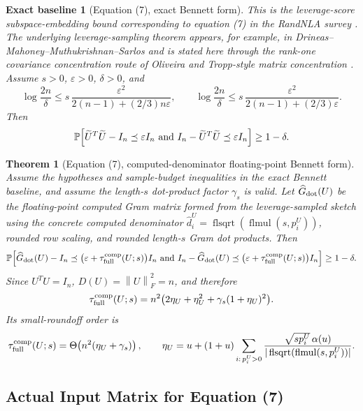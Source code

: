 \documentclass[11pt]{article}
\newcommand{\Prob}{\mathbb{P}}
\newcommand{\Frob}[1]{\left\lVert #1\right\rVert_F}
\newcommand{\Util}{\widetilde U}
\newcommand{\Ghat}{\widehat G}
\newcommand{\I}{I}
\newcommand{\eps}{\varepsilon}
\newtheorem{theorem}{Theorem}
\newtheorem*{baseline}{Exact baseline}
\theoremstyle{remark}
\begin{document}
\begin{baseline}[Equation (7), exact Bennett form]
This is the leverage-score subspace-embedding bound corresponding to equation
(7) in the RandNLA survey \cite{DrineasMahoney2016RandNLA}.  The underlying
leverage-sampling theorem appears, for example, in
Drineas--Mahoney--Muthukrishnan--Sarlos \cite{DrineasMahoneyMuthukrishnanSarlos2011}
and is stated here through the rank-one covariance concentration route of
Oliveira \cite{Oliveira2010} and Tropp-style matrix concentration
\cite{Tropp2012}.
Assume \(s>0\), \(\eps>0\), \(\delta>0\), and
\[
  \log\frac{2n}{\delta}
  \le
  s\,\frac{\eps^2}{2(n-1)+(2/3)n\eps},
  \qquad
  \log\frac{2n}{\delta}
  \le
  s\,\frac{\eps^2}{2(n-1)+(2/3)\eps}.
\]
Then
\[
  \Prob\!\left[
    \Util^T\Util-\I_n\preceq \eps\I_n
    \ \hbox{and}\
    \I_n-\Util^T\Util\preceq \eps\I_n
  \right]\ge 1-\delta .
\]
\end{baseline}

\begin{theorem}[Equation (7), computed-denominator floating-point Bennett form]
Assume the hypotheses and sample-budget inequalities in the exact Bennett
baseline, and assume the length-\(s\) dot-product factor \(\gamma_s\) is valid.
Let \(\Ghat_{\rm dot}(U)\) be the floating-point computed Gram matrix formed
from the leverage-sampled sketch using the concrete computed denominator
\(\widehat d_i^U=\operatorname{flsqrt}(\operatorname{flmul}(s,p_i^U))\),
rounded row scaling, and rounded length-\(s\) Gram dot products.  Then
\[
  \Prob\!\left[
    \Ghat_{\rm dot}(U)-\I_n
      \preceq
      \bigl(\eps+\tau_{\rm full}^{\rm comp}(U;s)\bigr)\I_n
    \ \hbox{and}\
    \I_n-\Ghat_{\rm dot}(U)
      \preceq
      \bigl(\eps+\tau_{\rm full}^{\rm comp}(U;s)\bigr)\I_n
  \right]\ge 1-\delta .
\]
Since \(U^TU=\I_n\), \(D(U)=\Frob{U}^2=n\), and therefore
\[
  \tau_{\rm full}^{\rm comp}(U;s)
  =
  n^2\bigl(2\eta_U+\eta_U^2+\gamma_s(1+\eta_U)^2\bigr).
\]
Its small-roundoff order is
\[
  \tau_{\rm full}^{\rm comp}(U;s)
  =
  \Theta\!\left(n^2(\eta_U+\gamma_s)\right),
  \qquad
  \eta_U=u+(1+u)
  \sum_{i:\,p_i^U>0}
    \frac{\sqrt{s p_i^U}\,\alpha(u)}
         {|\operatorname{flsqrt}(\operatorname{flmul}(s,p_i^U))|}.
\]
\end{theorem}

\subsection*{Actual Input Matrix for Equation (7)}
\end{document}
